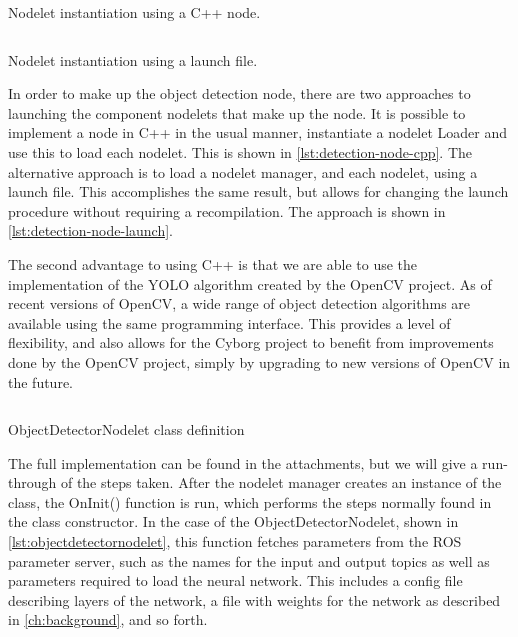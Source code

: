 \documentclass[\rootfolder/main.tex]{subfiles}
\begin{document}
\begin{listing}
    \inputminted{cpp}{\rootfolder/Chapters/Chapter5/Listings/object_detector_node.cpp}
    \caption{Nodelet instantiation using a C++ node.\label{lst:detection-node-cpp}}
\end{listing}

\begin{listing}
    \inputminted{xml}{\rootfolder/Chapters/Chapter5/Listings/ros_dnn.launch}
    \caption{Nodelet instantiation using a launch file.\label{lst:detection-node-launch}}
\end{listing}

In order to make up the object detection node, there are two approaches to launching the component nodelets that make up the node.
It is possible to implement a node in C++ in the usual manner, instantiate a nodelet Loader and use this to load each nodelet.
This is shown in \cref{lst:detection-node-cpp}.
The alternative approach is to load a nodelet manager, and each nodelet, using a launch file.
This accomplishes the same result, but allows for changing the launch procedure without requiring a recompilation.
The approach is shown in \cref{lst:detection-node-launch}.

The second advantage to using C++ is that we are able to use the implementation of the YOLO algorithm created by the OpenCV project.
As of recent versions of OpenCV, a wide range of object detection algorithms are available using the same programming interface.
This provides a level of flexibility, and also allows for the Cyborg project to benefit from improvements done by the OpenCV project, simply by upgrading to new versions of OpenCV in the future.

\begin{listing}
    \inputminted{cpp}{\rootfolder/Chapters/Chapter5/Listings/ObjectDetectorNodelet}
    \caption{ObjectDetectorNodelet class definition\label{lst:objectdetectornodelet}}
\end{listing}

The full implementation can be found in the attachments, but we will give a run-through of the steps taken.
After the nodelet manager creates an instance of the class, the OnInit() function is run, which performs the steps normally found in the class constructor.
In the case of the ObjectDetectorNodelet, shown in \cref{lst:objectdetectornodelet}, this function fetches parameters from the ROS parameter server, such as the names for the input and output topics as well as parameters required to load the neural network.
This includes a config file describing layers of the network, a file with weights for the network as described in \cref{ch:background}, and so forth.
\end{document}
